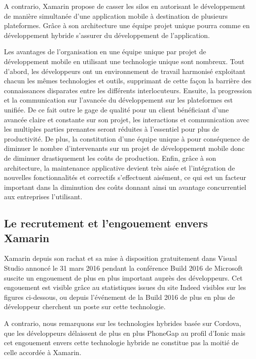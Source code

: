 \documentclass[11]{article}
\begin{document}
 \vspace{0.5cm}

A contrario, Xamarin propose de casser les silos en autorisant le développement de manière simultanée d’une application mobile à destination de plusieurs plateformes. Grâce à son architecture une équipe projet unique pourra comme en développement hybride s’assurer du développement de l’application. 
 \vspace{0.5cm}

Les avantages de l’organisation en une équipe unique par projet de développement mobile en utilisant une technologie unique sont nombreux. Tout d’abord, les développeurs ont un environnement de travail harmonisé exploitant chacun les mêmes technologies et outils, supprimant de cette façon la barrière des connaissances disparates entre les différents interlocuteurs. Ensuite, la progression et la communication sur l’avancée du développement sur les plateformes est unifiée. De ce fait outre le gage de qualité pour un client bénéficiant d’une avancée claire et constante sur son projet, les interactions et communication avec les multiples parties prenantes seront réduites à l’essentiel pour plus de productivité. De plus, la constitution d’une équipe unique à pour conséquence de diminuer le nombre d’intervenants sur un projet de développement mobile donc de diminuer drastiquement les coûts de production. Enfin, grâce à son architecture, la maintenance applicative devient très aisée et l’intégration de nouvelles fonctionnalités et correctifs s’effectuent aisément, ce qui est un facteur important dans la diminution des coûts donnant ainsi un avantage concurrentiel aux entreprises l’utilisant.

\subsection{Le recrutement et l’engouement envers Xamarin}
Xamarin depuis son rachat et sa mise à disposition gratuitement dans Visual Studio annoncé le 31 mars 2016 pendant la conférence Build 2016 de Microsoft suscite un engouement de plus en plus important auprès des développeurs. Cet engouement est visible grâce au statistiques issues du site Indeed visibles sur les figures ci-dessous, ou depuis l'événement de la Build 2016 de plus en plus de développeur cherchent un poste sur cette technologie. 

 \vspace{0.5cm}
 
A contrario, nous remarquons sur les technologies hybrides basée sur Cordova, que les développeurs délaissent de plus en plus PhoneGap au profil d’Ionic mais cet engouement envers cette technologie hybride ne constitue pas la moitié de celle accordée à Xamarin.
\end{document}

